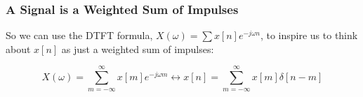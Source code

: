 \begin{frame}
  \frametitle{A Signal is a Weighted Sum of Impulses}

  So we can use the DTFT formula, $X(\omega)=\sum x[n]e^{-j\omega n}$,
  to inspire us to think about $x[n]$ as just a weighted sum of impulses:

  \vspace*{1cm}
  
  \[
  X(\omega)=\sum_{m=-\infty}^\infty x[m]e^{-j\omega m}
  \leftrightarrow x[n]=\sum_{m=-\infty}^\infty x[m]\delta[n-m]
  \]
\end{frame}

